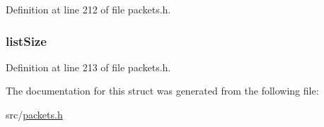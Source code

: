Definition at line 212 of file packets.\+h.

\hypertarget{struct_c_o_n_t_i_n_u_e___l_i_s_t___f_i_l_e_s_abfa15b3e9c94f60be2f38c77d1dbe5ae}{}
\subsubsection[{list\+Size}]{ list\+Size}\label{struct_c_o_n_t_i_n_u_e___l_i_s_t___f_i_l_e_s_abfa15b3e9c94f60be2f38c77d1dbe5ae}


Definition at line 213 of file packets.\+h.



The documentation for this struct was generated from the following file\+:\begin{DoxyCompactItemize}
\item 
src/\hyperlink{packets_8h}{packets.\+h}\end{DoxyCompactItemize}
